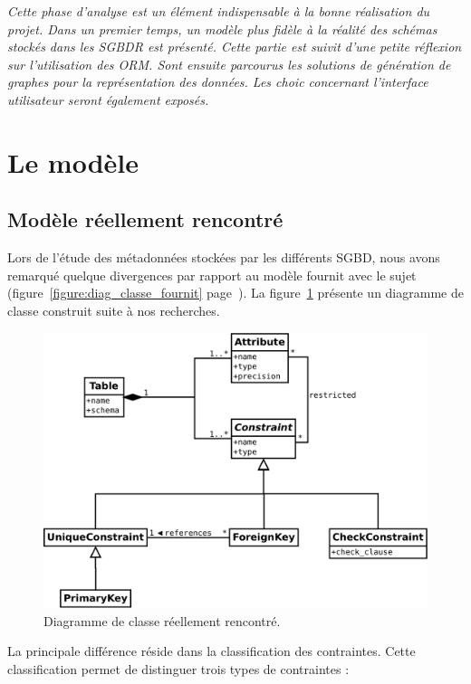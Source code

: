 \textit{Cette phase d'analyse est un élément indispensable à la bonne réalisation du projet. Dans un premier temps, un modèle plus fidèle à la réalité des schémas stockés dans les SGBDR est présenté. Cette partie est suivit d'une petite réflexion sur l'utilisation des ORM. Sont ensuite parcourus les solutions de génération de graphes pour la représentation des données. Les choic concernant l'interface utilisateur seront également exposés.}

\section{Le modèle}
\subsection{Modèle réellement rencontré}

Lors de l'étude des métadonnées stockées par les différents SGBD, nous avons remarqué quelque divergences par rapport au modèle fournit avec le sujet (figure~\ref{figure:diag_classe_fournit} page~\pageref{figure:diag_classe_fournit}). La figure~\ref{figure:diag_classe_reel} présente un diagramme de classe construit suite à nos recherches.

\begin{figure}[H]
\centering
\includegraphics[width=\textwidth]{files/diag_class_ameliore}
\caption{Diagramme de classe réellement rencontré.}
\label{figure:diag_classe_reel}
\end{figure}

La principale différence réside dans la classification des contraintes. Cette classification permet de distinguer trois types de contraintes :

